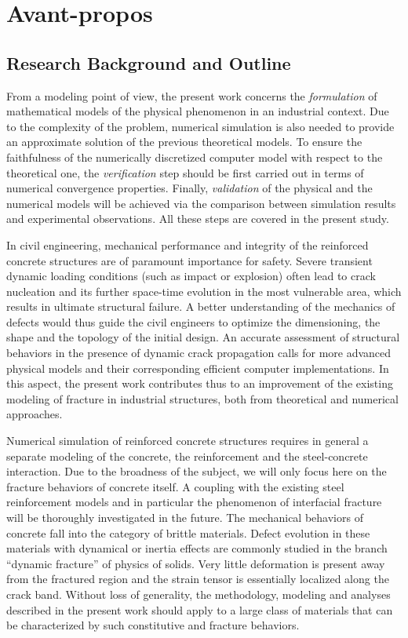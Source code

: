 \chapter{Avant-propos}

\section*{Research Background and Outline}
From a modeling point of view, the present work concerns the \emph{formulation} of mathematical models of the physical phenomenon in an industrial context. Due to the complexity of the problem, numerical simulation is also needed to provide an approximate solution of the previous theoretical models. To ensure the faithfulness of the numerically discretized computer model with respect to the theoretical one, the \emph{verification} step should be first carried out in terms of numerical convergence properties. Finally, \emph{validation} of the physical and the numerical models will be achieved via the comparison between simulation results and experimental observations. All these steps are covered in the present study.

In civil engineering, mechanical performance and integrity of the reinforced concrete structures are of paramount importance for safety. Severe transient dynamic loading conditions (such as impact or explosion) often lead to crack nucleation and its further space-time evolution in the most vulnerable area, which results in ultimate structural failure. A better understanding of the mechanics of defects would thus guide the civil engineers to optimize the dimensioning, the shape and the topology of the initial design. An accurate assessment of structural behaviors in the presence of dynamic crack propagation calls for more advanced physical models and their corresponding efficient computer implementations. In this aspect, the present work contributes thus to an improvement of the existing modeling of fracture in industrial structures, both from theoretical and numerical approaches.

Numerical simulation of reinforced concrete structures requires in general a separate modeling of the concrete, the reinforcement and the steel-concrete interaction. Due to the broadness of the subject, we will only focus here on the fracture behaviors of concrete itself. A coupling with the existing steel reinforcement models and in particular the phenomenon of interfacial fracture will be thoroughly investigated in the future. The mechanical behaviors of concrete fall into the category of brittle materials. Defect evolution in these materials with dynamical or inertia effects are commonly studied in the branch ``dynamic fracture'' of physics of solids. Very little deformation is present away from the fractured region and the strain tensor is essentially localized along the crack band. Without loss of generality, the methodology, modeling and analyses described in the present work should apply to a large class of materials that can be characterized by such constitutive and fracture behaviors.

